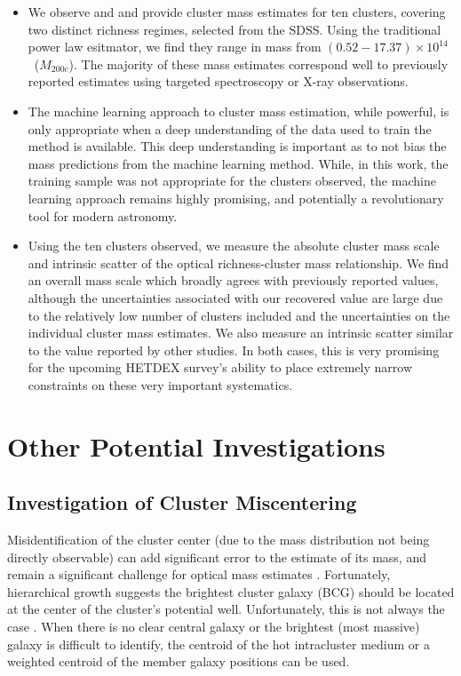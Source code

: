 \begin{itemize}
	\item We observe and and provide cluster mass estimates for ten clusters, covering two distinct richness regimes, selected from the SDSS. Using the traditional power law esitmator, we find they range in mass from $(0.52-17.37) \times 10^{14}$ \Msol\ ($M_{200c}$). The majority of these mass estimates correspond well to previously reported estimates using targeted spectroscopy or X-ray observations.
	
	\item The machine learning approach to cluster mass estimation, while powerful, is only appropriate when a deep understanding of the data used to train the method is available. This deep understanding is important as to not bias the mass predictions from the machine learning method. While, in this work, the training sample was not appropriate for the clusters observed, the machine learning approach remains highly promising, and potentially a revolutionary tool for modern astronomy.
	
	\item Using the ten clusters observed, we measure the absolute cluster mass scale and intrinsic scatter of the optical richness-cluster mass relationship. We find an overall mass scale which broadly agrees with previously reported values, although the uncertainties associated with our recovered value are large due to the relatively low number of clusters included and the uncertainties on the individual cluster mass estimates. We also measure an intrinsic scatter similar to the value reported by other studies. In both cases, this is very promising for the upcoming HETDEX survey's ability to place extremely narrow constraints on these very important systematics.
\end{itemize}

\section{Other Potential Investigations}\label{sec: future}
\subsection{Investigation of Cluster Miscentering}
Misidentification of the cluster center (due to the mass distribution not being directly observable) can add significant error to the estimate of its mass, and remain a significant challenge for optical mass estimates . Fortunately, hierarchical growth suggests the brightest cluster galaxy (BCG) should be located at the center of the cluster's potential well. Unfortunately, this is not always the case . When there is no clear central galaxy or the brightest (most massive) galaxy is difficult to identify, the centroid of the hot intracluster medium or a weighted centroid of the member galaxy positions  can be used.

